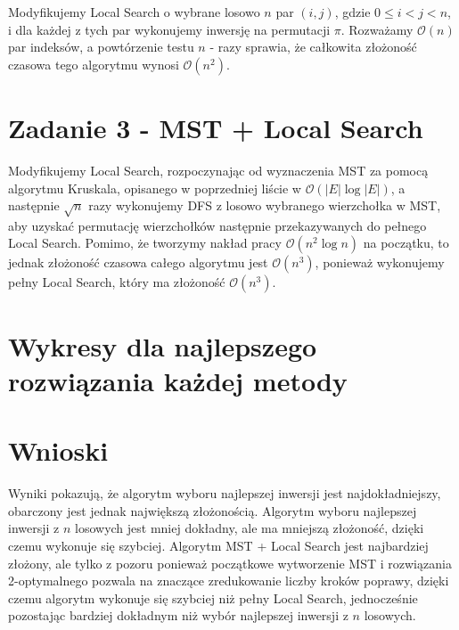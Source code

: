\documentclass{article}
\begin{document}
Modyfikujemy Local Search o wybrane losowo $n$ par $(i,j)$, gdzie $0 \leq i < j < n$, i dla każdej z tych par wykonujemy inwersję na permutacji $\pi$.
Rozważamy $\mathcal{O}(n)$ par indeksów, a powtórzenie testu $n$ - razy sprawia, że całkowita złożoność czasowa tego algorytmu wynosi $\mathcal{O}(n^2)$.



\section{Zadanie 3 - MST + Local Search}

Modyfikujemy Local Search, rozpoczynając od wyznaczenia MST za pomocą algorytmu Kruskala, opisanego w poprzedniej liście w $\mathcal{O}(|E| \log |E|)$,
a następnie $\sqrt{n}$ razy wykonujemy DFS z losowo wybranego wierzchołka w MST, aby uzyskać permutację wierzchołków następnie przekazywanych do pełnego Local Search.
Pomimo, że tworzymy nakład pracy $\mathcal{O}(n^2 \log n)$ na początku, to jednak złożoność czasowa całego algorytmu jest $\mathcal{O}(n^3)$, ponieważ wykonujemy pełny Local Search, który ma złożoność $\mathcal{O}(n^3)$.


\section{Wykresy dla najlepszego rozwiązania każdej metody}



\section{Wnioski}

Wyniki pokazują, że algorytm wyboru najlepszej inwersji jest najdokładniejszy, obarczony jest jednak
największą złożonością. Algorytm wyboru najlepszej inwersji z $n$ losowych jest mniej dokładny, ale ma mniejszą złożoność,
dzięki czemu wykonuje się szybciej.
Algorytm MST + Local Search jest najbardziej złożony, ale tylko z pozoru ponieważ początkowe wytworzenie MST i rozwiązania
2-optymalnego pozwala na znaczące zredukowanie liczby kroków poprawy, dzięki czemu algorytm wykonuje się szybciej niż
pełny Local Search, jednocześnie pozostając bardziej dokładnym niż wybór najlepszej inwersji z $n$ losowych. 
\end{document}
